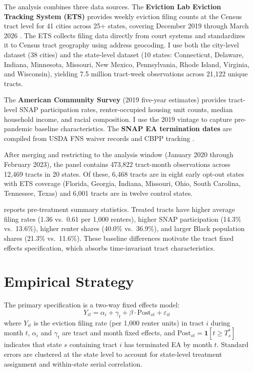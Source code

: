 \documentclass[12pt]{article}
\begin{document}
The analysis combines three data sources. The \textbf{Eviction Lab Eviction Tracking System (ETS)} provides weekly eviction filing counts at the Census tract level for 41 cities across 25+ states, covering December 2019 through March 2026 \citep{EvictionLab2024}. The ETS collects filing data directly from court systems and standardizes it to Census tract geography using address geocoding. I use both the city-level dataset (38 cities) and the state-level dataset (10 states: Connecticut, Delaware, Indiana, Minnesota, Missouri, New Mexico, Pennsylvania, Rhode Island, Virginia, and Wisconsin), yielding 7.5 million tract-week observations across 21,122 unique tracts.

The \textbf{American Community Survey} (2019 five-year estimates) provides tract-level SNAP participation rates, renter-occupied housing unit counts, median household income, and racial composition. I use the 2019 vintage to capture pre-pandemic baseline characteristics. The \textbf{SNAP EA termination dates} are compiled from USDA FNS waiver records and CBPP tracking \citep{CBPP2022EA}.

After merging and restricting to the analysis window (January 2020 through February 2023), the panel contains 473,822 tract-month observations across 12,469 tracts in 20 states. Of these, 6,468 tracts are in eight early opt-out states with ETS coverage (Florida, Georgia, Indiana, Missouri, Ohio, South Carolina, Tennessee, Texas) and 6,001 tracts are in twelve control states.



 reports pre-treatment summary statistics. Treated tracts have higher average filing rates (1.36 vs.\ 0.61 per 1,000 renters), higher SNAP participation (14.3\% vs.\ 13.6\%), higher renter shares (40.0\% vs.\ 36.9\%), and larger Black population shares (21.3\% vs.\ 11.6\%). These baseline differences motivate the tract fixed effects specification, which absorbs time-invariant tract characteristics.

\section{Empirical Strategy}

The primary specification is a two-way fixed effects model:
\begin{equation}
Y_{it} = \alpha_i + \gamma_t + \beta \cdot \text{Post}_{st} + \varepsilon_{it}
\label{eq:twfe}
\end{equation}
where $Y_{it}$ is the eviction filing rate (per 1,000 renter units) in tract $i$ during month $t$, $\alpha_i$ and $\gamma_t$ are tract and month fixed effects, and $\text{Post}_{st} = \mathbf{1}[t \geq T_s^*]$ indicates that state $s$ containing tract $i$ has terminated EA by month $t$. Standard errors are clustered at the state level to account for state-level treatment assignment and within-state serial correlation.
\end{document}
